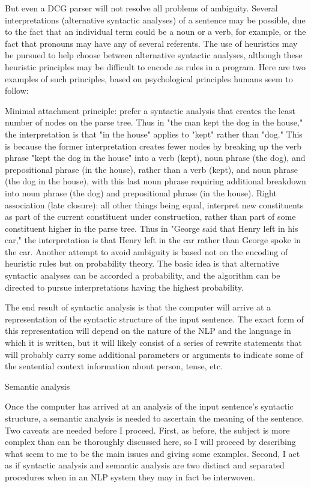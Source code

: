 But even a DCG parser will not resolve all problems of ambiguity. Several interpretations (alternative syntactic analyses) of a sentence may be possible, due to the fact that an individual term could be a noun or a verb, for example, or the fact that pronouns may have any of several referents. The use of heuristics may be pursued to help choose between alternative syntactic analyses, although these heuristic principles may be difficult to encode as rules in a program. Here are two examples of such principles, based on psychological principles humans seem to follow:

Minimal attachment principle: prefer a syntactic analysis that creates the least number of nodes on the parse tree. Thus in "the man kept the dog in the house," the interpretation is that "in the house" applies to "kept" rather than "dog." This is because the former interpretation creates fewer nodes by breaking up the verb phrase "kept the dog in the house" into a verb (kept), noun phrase (the dog), and prepositional phrase (in the house), rather than a verb (kept), and noun phrase (the dog in the house), with this last noun phrase requiring additional breakdown into noun phrase (the dog) and prepositional phrase (in the house).
Right association (late closure): all other things being equal, interpret new constituents as part of the current constituent under construction, rather than part of some constituent higher in the parse tree. Thus in "George said that Henry left in his car," the interpretation is that Henry left in the car rather than George spoke in the car.
Another attempt to avoid ambiguity is based not on the encoding of heuristic rules but on probability theory. The basic idea is that alternative syntactic analyses can be accorded a probability, and the algorithm can be directed to pursue interpretations having the highest probability.

The end result of syntactic analysis is that the computer will arrive at a representation of the syntactic structure of the input sentence. The exact form of this representation will depend on the nature of the NLP and the language in which it is written, but it will likely consist of a series of rewrite statements that will probably carry some additional parameters or arguments to indicate some of the sentential context information about person, tense, etc.

Semantic analysis

Once the computer has arrived at an analysis of the input sentence's syntactic structure, a semantic analysis is needed to ascertain the meaning of the sentence. Two caveats are needed before I proceed. First, as before, the subject is more complex than can be thoroughly discussed here, so I will proceed by describing what seem to me to be the main issues and giving some examples. Second, I act as if syntactic analysis and semantic analysis are two distinct and separated procedures when in an NLP system they may in fact be interwoven.


